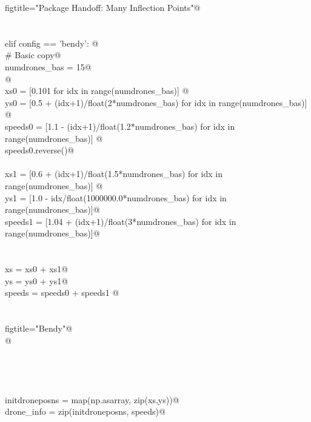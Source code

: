 \documentclass[10.0pt]{report}
\begin{document}
\begin{flushleft}
\begin{minipage}{\linewidth}
\begin{list}{}{}
\mbox{}\verb@        figtitle="Package Handoff: Many Inflection Points"@\\
\mbox{}\verb@@\\
\mbox{}\verb@@\\
\mbox{}\verb@    elif config == 'bendy':   @\\
\mbox{}\verb@        # Basic copy@\\
\mbox{}\verb@        numdrones_bas = 15@\\
\mbox{}\verb@ @\\
\mbox{}\verb@        xs0     = [0.101                                for idx in range(numdrones_bas)] @\\
\mbox{}\verb@        ys0     = [0.5 + (idx+1)/float(2*numdrones_bas)         for idx in range(numdrones_bas)] @\\
\mbox{}\verb@        speeds0 = [1.1 - (idx+1)/float(1.2*numdrones_bas) for idx in range(numdrones_bas)] @\\
\mbox{}\verb@        speeds0.reverse()@\\
\mbox{}\verb@@\\
\mbox{}\verb@        xs1    = [0.6 + (idx+1)/float(1.5*numdrones_bas)         for idx in range(numdrones_bas)] @\\
\mbox{}\verb@        ys1    = [1.0 - idx/float(1000000.0*numdrones_bas) for idx in range(numdrones_bas)]@\\
\mbox{}\verb@        speeds1 = [1.04 + (idx+1)/float(3*numdrones_bas) for idx in range(numdrones_bas)]@\\
\mbox{}\verb@@\\
\mbox{}\verb@@\\
\mbox{}\verb@        xs = xs0 + xs1@\\
\mbox{}\verb@        ys = ys0 + ys1@\\
\mbox{}\verb@        speeds = speeds0 + speeds1 @\\
\mbox{}\verb@@\\
\mbox{}\verb@@\\
\mbox{}\verb@        figtitle="Bendy"@\\
\mbox{}\verb@     @\\
\mbox{}\verb@@\\
\mbox{}\verb@@\\
\mbox{}\verb@@\\
\mbox{}\verb@@\\
\mbox{}\verb@    initdroneposns = map(np.asarray, zip(xs,ys))@\\
\mbox{}\verb@    drone_info     = zip(initdroneposns, speeds)@\\

\end{list}
\end{minipage}
\end{flushleft}
\end{document}
